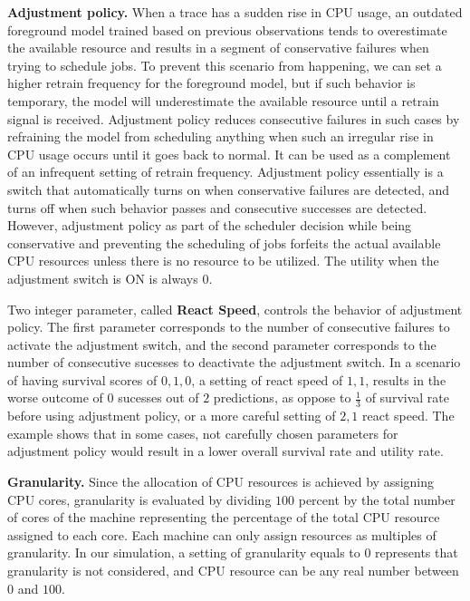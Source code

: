 \documentclass[sigplan,10pt,review,anonymous]{acmart}
\begin{document}
\textbf{Adjustment policy.} When a trace has a sudden rise in CPU usage, an
outdated foreground model trained based on previous observations tends to
overestimate the available resource and results in a segment of conservative
failures when trying to schedule jobs. To prevent this scenario from happening,
we can set a higher retrain frequency for the foreground model, but if such
behavior is temporary, the model will underestimate the available resource until
a retrain signal is received. Adjustment policy reduces consecutive failures in
such cases by refraining the model from scheduling anything when such an irregular
rise in CPU usage occurs until it goes back to normal. It can be used as a
complement of an infrequent setting of retrain frequency. Adjustment policy
essentially is a switch that automatically turns on when conservative failures
are detected, and turns off when such behavior passes and consecutive successes
are detected. However, adjustment policy as part of the scheduler decision while
being conservative and preventing the scheduling of jobs forfeits the actual
available CPU resources unless there is no resource to be utilized. The
utility when the adjustment switch is ON is always $0$. 

Two integer parameter, called \textbf{React Speed}, controls the behavior of
adjustment policy. The first parameter corresponds to the number of consecutive
failures to activate the adjustment switch, and the second parameter corresponds
to the number of consecutive sucesses to deactivate the adjustment switch. In a
scenario of having survival scores of $0,1,0$, a setting of react speed of
$1,1$, results in the worse outcome of $0$ sucesses out of $2$ predictions, as
oppose to $\frac{1}{3}$ of survival rate before using adjustment policy, or a
more careful setting of $2,1$ react speed. The example shows that in some cases,
not carefully chosen parameters for adjustment policy would result in a lower
overall survival rate and utility rate. 

\textbf{Granularity.} Since the allocation of CPU resources is achieved by
assigning CPU cores, granularity is evaluated by dividing $100$ percent by the
total number of cores of the machine representing the percentage of the total
CPU resource assigned to each core. Each machine can only assign resources as
multiples of granularity. In our simulation, a setting of granularity equals to
$0$ represents that granularity is not considered, and CPU resource can be any
real number between $0$ and $100$.
\end{document}
